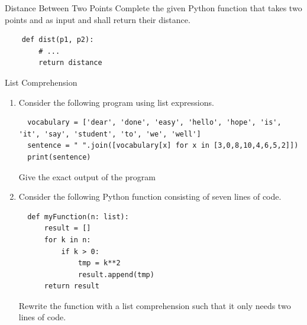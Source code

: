 \documentclass[twoside]{article}
\begin{document}
\begin{task}{Distance Between Two Points}{}{}
Complete the given Python function  that takes two points  and  as input and shall return their distance.
\begin{lstlisting}
    def dist(p1, p2):
        # ...
        return distance
\end{lstlisting}
\end{task}

\clearpage

\begin{task}{List Comprehension}{}{}
  \begin{enumerate}
  \item{Consider the following program using list expressions.}
  \begin{lstlisting}
  vocabulary = ['dear', 'done', 'easy', 'hello', 'hope', 'is', 'it', 'say', 'student', 'to', 'we', 'well']
  sentence = " ".join([vocabulary[x] for x in [3,0,8,10,4,6,5,2]])
  print(sentence)
  \end{lstlisting}
  Give the exact output of the program 

\vspace*{6cm}


  \item{Consider the following Python function consisting of seven lines of code.}
  \begin{lstlisting}
  def myFunction(n: list):
      result = []
      for k in n:
          if k > 0:
              tmp = k**2
              result.append(tmp)
      return result
  \end{lstlisting}
  Rewrite the function with a list comprehension such that it only needs two lines of code.
  \end{enumerate}

\end{task}
\end{document}
